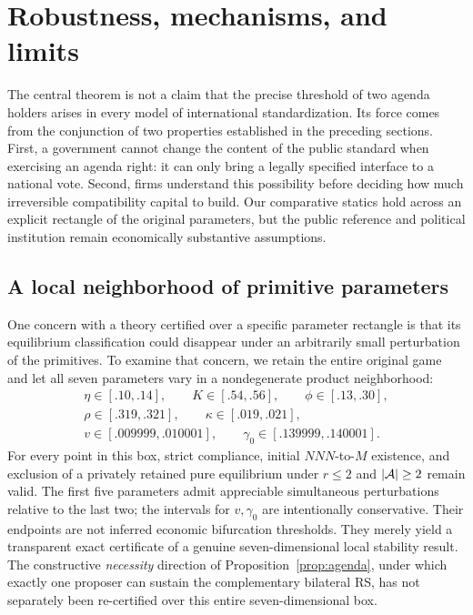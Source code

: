 \section{Robustness, mechanisms, and limits}\label{sec:robustness}

The central theorem is not a claim that the precise threshold of two agenda holders arises in every model of international standardization. Its force comes from the conjunction of two properties established in the preceding sections. First, a government cannot change the content of the public standard when exercising an agenda right: it can only bring a legally specified interface to a national vote. Second, firms understand this possibility before deciding how much irreversible compatibility capital to build. Our comparative statics hold across an explicit rectangle of the original parameters, but the public reference and political institution remain economically substantive assumptions.

\subsection{A local neighborhood of primitive parameters}\label{subsec:local}

One concern with a theory certified over a specific parameter rectangle is that its equilibrium classification could disappear under an arbitrarily small perturbation of the primitives. To examine that concern, we retain the entire original game and let all seven parameters vary in a nondegenerate product neighborhood:
\begin{equation}
\begin{gathered}
 \eta\in[.10,.14],\qquad K\in[.54,.56],\qquad
 \phi\in[.13,.30],\\
 \rho\in[.319,.321],\qquad
 \kappa\in[.019,.021],\\
 v\in[.009999,.010001],\qquad
 \gamma_0\in[.139999,.140001].
\end{gathered}
\label{eq:robust-box}
\end{equation}
For every point in this box, strict compliance, initial \(NNN\)-to-\(M\) existence, and exclusion of a privately retained pure equilibrium under \(r\le2\) and \(|\mathcal{A}|\ge2\) remain valid. The first five parameters admit appreciable simultaneous perturbations relative to the last two; the intervals for \(v,\gamma_0\) are intentionally conservative. Their endpoints are not inferred economic bifurcation thresholds. They merely yield a transparent exact certificate of a genuine seven-dimensional local stability result. The constructive \emph{necessity} direction of Proposition~\ref{prop:agenda}, under which exactly one proposer can sustain the complementary bilateral RS, has not separately been re-certified over this entire seven-dimensional box.

